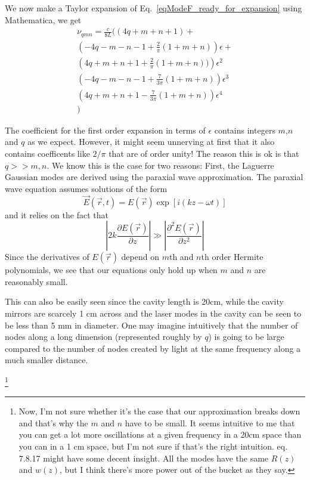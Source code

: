 We now make a Taylor expansion of Eq.\ \ref{eqModeF_ready_for_expansion} using Mathematica, we get 
\begin{align*}
\nu_{qmn}=\frac{c}{8L}\biggl((4q+m+n+1) +\\
 \left(-4q-m-n-1+\frac{2}{\pi}(1+m+n)\right)\epsilon+\\
 \left(4q+m+n+1+\frac{2}{\pi}(1+m+n))\right)\epsilon^2\\
 \left(-4q-m-n-1+\frac{7}{3\pi}(1+m+n)\right)\epsilon^3\\
 \left(4q+m+n+1-\frac{7}{3\pi}(1+m+n)\right)\epsilon^4\\
\biggr)
\end{align*}

The coefficient for the first order expansion in terms of $\epsilon$ contains integers $m$,$n$ and $q$ as we expect. 
However, it might seem unnerving at first that it also contains coefficents like $2/\pi$ that are of order unity! The reason this is ok is that $q>>m,n$. We know this is the case for two reasons: First, the Laguerre Gaussian modes are derived using the paraxial wave approximation. The paraxial wave equation assumes solutions of the form
\begin{equation}
\vec{E}(\vec{r},t)=E(\vec{r})\exp[i(kz-\omega t)]
\end{equation}
and it relies on the fact that 
\begin{equation}
\left|2k\frac{\partial E(\vec{r})}{\partial z}\right|\gg\left|\frac{\partial^2E(\vec{r})}{\partial z^2}\right|
\end{equation}
Since the derivatives of $E(\vec{r})$ depend on $m$th and $n$th order Hermite polynomials, we see that our equations only hold up when $m$ and $n$ are reasonably small. 

This can also be easily seen since the cavity length is 20cm, while the cavity mirrors are scarcely 1 cm across and the laser modes in the cavity can be seen to be less than 5 mm in diameter. One may imagine intuitively that the number of nodes along a long dimension (represented roughly by $q$) is going to be large compared to the number of nodes created by light at the same frequency along a much smaller distance. 

\footnote{Now, I'm not sure whether it's the case that our approximation breaks down and that's why the $m$ and $n$ have to be small. It seems intuitive to me that you can get a lot more oscillations at a given frequency in a 20cm space than you can in a 1 cm space, but I'm not sure if that's the right intuition.\cite{lasersMilonniEberly} eq. 7.8.17 might have some decent insight. All the modes have the same $R(z)$ and $w(z)$, but I think there's more power out of the bucket as they say.  }

